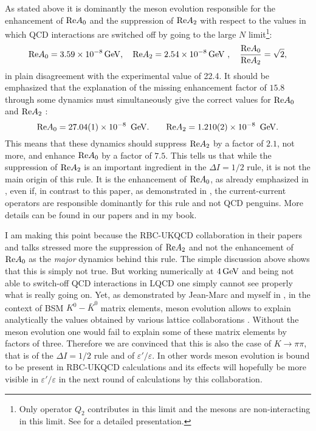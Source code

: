\documentclass[12pt,a4paper]{article}
\newcommand{\RE}{{\rm Re}}
\newcommand{\gev}{\, {\rm GeV}}
\def\epe{\varepsilon'/\varepsilon}
\newcommand{\be}{\begin{equation}}
\newcommand{\ee}{\end{equation}}
\begin{document}
 As stated above it is dominantly the meson evolution responsible for
 the enhancement of ${\RE A_0}$ and the suppression of ${\RE A_2}$ with respect
 to the values in which QCD interactions are switched off by going to the large $N$ limit\footnote{Only operator $Q_2$ contributes in this limit and the mesons are non-interacting in this limit. See  \cite{Buras:2014maa,Buras:2020xsm} for a detailed presentation.}:
\be\label{LO}
{\rm Re}A_0=3.59\times 10^{-8}\gev ,\quad   {\rm Re}A_2= 2.54\times 10^{-8}\gev~, \quad \frac{\RE A_0}{\RE A_2}=\sqrt{2},
\ee
in plain disagreement with the experimental value of 22.4.
It should be emphasized that the explanation of the  missing enhancement factor of $15.8$ through some dynamics must simultaneously give the correct values for ${\rm Re}A_0$ and  ${\rm Re}A_2$
\cite{Tanabashi:2018oca}:
\be\label{N1}
{\rm Re}A_0= 27.04(1)\times 10^{-8}~\gev.
\quad
\quad {\rm Re}A_2= 1.210(2)   \times 10^{-8}~\gev.
\ee
This means that these dynamics should suppress  ${\rm Re}A_2$ by a factor of $2.1$, not more, and enhance ${\rm Re}A_0$ by a factor of $7.5$. This tells us 
that while the suppression of  ${\rm Re}A_2$  is an important ingredient in 
the $\Delta I=1/2$ rule, it is not the main origin of this rule.
 It is the enhancement of  ${\rm Re}A_0$,  as
already emphasized in \cite{Shifman:1975tn}, even if, in contrast to this paper, as demonstrated in \cite{Bardeen:1986vz}, the
current-current operators are responsible dominantly for this rule and not 
QCD penguins. More details can be found in our papers and in my book.

I am making this point because the RBC-UKQCD collaboration in their papers and talks stressed more the suppression of ${\rm Re}A_2$ and not
the enhancement of ${\rm Re}A_0$ as the {\em major} dynamics
behind this rule. The simple discussion above shows that this is simply not true. But  working numerically
at $4\gev$ and being not able to switch-off QCD interactions in LQCD one simply  cannot see properly what is really going on. Yet, as demonstrated by Jean-Marc and myself in
\cite{Buras:2018lgu}, in the context of BSM $K^0-\bar K^0$ matrix elements,
meson evolution allows to explain analytically the values obtained by various lattice collaborations \cite{Carrasco:2015pra,Jang:2015sla,Garron:2016mva,Boyle:2017skn,Boyle:2017ssm}. Without the meson evolution one would fail to explain some of these matrix elements by factors of three. Therefore we are convinced that this is also the case of $K\to\pi\pi$, that is of the $\Delta I=1/2$ rule and of $\epe$. In other words meson evolution is bound to be
present in RBC-UKQCD calculations and its effects will hopefully be more
visible in $\epe$ in the next round of calculations by this collaboration.
\end{document}
